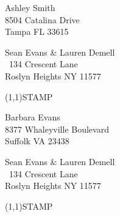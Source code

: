 \documentclass[12pt]{article}
\begin{document}
\begin{center} \begin{Huge} \vspace*{\fill}
Ashley Smith\\
8504 Catalina Drive\\
Tampa FL 33615\\
\vspace{\fill} \end{Huge} \end{center}

\clearpage

\begin{minipage}{.5\linewidth} \noindent
Sean Evans \& Lauren Demell\\\ 
134 Crescent Lane\\ 
Roslyn Heights NY 11577
\end{minipage}
\begin{minipage}{.5\linewidth \hspace{-.2in} \vspace{-.3in}}
\begin{flushright}
\framebox(1,1){STAMP}
\end{flushright}
\end{minipage}

\begin{center} \begin{Huge} \vspace*{\fill}
Barbara Evans\\
8377 Whaleyville Boulevard\\
Suffolk VA 23438\\
\vspace{\fill} \end{Huge} \end{center}

\clearpage

\begin{minipage}{.5\linewidth} \noindent
Sean Evans \& Lauren Demell\\\ 
134 Crescent Lane\\ 
Roslyn Heights NY 11577
\end{minipage}
\begin{minipage}{.5\linewidth \hspace{-.2in} \vspace{-.3in}}
\begin{flushright}
\framebox(1,1){STAMP}
\end{flushright}
\end{minipage}
\end{document}
